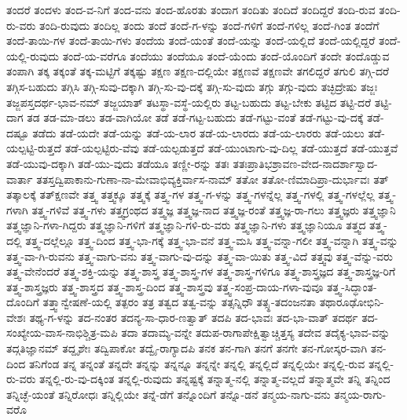 {ತಂದರೆ
ತಂದಳು
ತಂದ-ವ-ನಿಗೆ
ತಂದ-ವನು
ತಂದ-ಹೊರತು
ತಂದಾಗ
ತಂದಿತು
ತಂದಿದೆ
ತಂದಿದ್ದರೆ
ತಂದಿ-ರುವ
ತಂದಿ-ರು-ವರು
ತಂದಿ-ರುವುದು
ತಂದಿಲ್ಲ
ತಂದು
ತಂದೆ
ತಂದೆ-ಗ-ಳನ್ನು
ತಂದೆ-ಗಳಿಗೆ
ತಂದೆ-ಗಳಿಲ್ಲ
ತಂದೆ-ಗಿಂತ
ತಂದೆಗೆ
ತಂದೆ-ತಾಯಿ-ಗಳ
ತಂದೆ-ತಾಯಿ-ಗಳು
ತಂದೆಯ
ತಂದೆ-ಯಂತೆ
ತಂದೆ-ಯನ್ನು
ತಂದೆ-ಯಲ್ಲಿದೆ
ತಂದೆ-ಯಲ್ಲಿದ್ದರೆ
ತಂದೆ-ಯಲ್ಲಿ-ರುವುದು
ತಂದೆ-ಯ-ವರೆಗೂ
ತಂದೆಯು
ತಂದೆಯೂ
ತಂದೆ-ಯೆಂದು
ತಂದೆ-ಯೊಂದಿಗೆ
ತಂದೇ
ತಂದೊಡ್ಡುವ
ತಂಪಾಗಿ
ತಕ್ಕ
ತಕ್ಕಂತೆ
ತಕ್ಕ-ಮಟ್ಟಿಗೆ
ತಕ್ಕಷ್ಟು
ತಕ್ಷಣ
ತಕ್ಷಣ-ದಲ್ಲಿಯೇ
ತಕ್ಷಣವೆ
ತಕ್ಷಣವೇ
ತಗಲಿದ್ದರೆ
ತಗುಲಿ
ತಗ್ಗಿ-ದರೆ
ತಗ್ಗಿಸ-ಬಹುದು
ತಗ್ಗಿಸಿ
ತಗ್ಗಿ-ಸುವು-ದಕ್ಕಾಗಿ
ತಗ್ಗಿ-ಸು-ವು-ದಕ್ಕೆ
ತಗ್ಗಿ-ಸು-ವುದು
ತಗ್ಗು
ತಗ್ಗು-ವುದು
ತಚ್ಛಿದ್ರೇಷು
ತಜ್ಜಃ
ತಜ್ಜಪಸ್ತದರ್ಥ-ಭಾವ-ನಮ್
ತಜ್ಜಯಾತ್
ತಟಸ್ಥಾ-ವಸ್ಥೆ-ಯಲ್ಲಿರು
ತಟ್ಟ-ಬಹುದು
ತಟ್ಟ-ಬೇಕು
ತಟ್ಟಿದ
ತಟ್ಟಿ-ದರೆ
ತಟ್ಟಿ-ದಾಗ
ತಡ
ತಡ-ಮಾ-ಡಲು
ತಡ-ವಾಗಿಯೋ
ತಡೆ
ತಡೆ-ಗಟ್ಟ-ಬಹುದು
ತಡೆ-ಗಟ್ಟು-ವಂತೆ
ತಡೆ-ಗಟ್ಟು-ವು-ದಕ್ಕೆ
ತಡೆ-ದಷ್ಟೂ
ತಡೆದು
ತಡೆ-ಯದೇ
ತಡೆ-ಯನ್ನು
ತಡೆ-ಯ-ಲಾರ
ತಡೆ-ಯ-ಲಾರದು
ತಡೆ-ಯ-ಲಾರರು
ತಡೆ-ಯಲು
ತಡೆ-ಯಲ್ಪಟ್ಟಿ-ರುತ್ತದೆ
ತಡೆ-ಯಲ್ಪಟ್ಟಿರು-ವೆವು
ತಡೆ-ಯಲ್ಪಡುತ್ತದೆ
ತಡೆ-ಯುಂಟಾಗು-ವು-ದಿಲ್ಲ
ತಡೆ-ಯುತ್ತದೆ
ತಡೆ-ಯುತ್ತವೆ
ತಡೆ-ಯುವು-ದಕ್ಕಾಗಿ
ತಡೆ-ಯು-ವುದು
ತಡೆಯೂ
ತಣ್ಣೀ-ರನ್ನು
ತತಃ
ತತಃಪ್ರಾತಿಭಶ್ರಾವಣ-ವೇದ-ನಾದರ್ಶಾಸ್ವಾದ-ವಾರ್ತಾ
ತತಸ್ತದ್ವಿಪಾಕಾನು-ಗುಣಾ-ನಾ-ಮೇವಾಭಿವ್ಯಕ್ತಿರ್ವಾಸ-ನಾಮ್
ತತೋ
ತತೋ-ಣಿಮಾದಿಪ್ರಾ-ದುರ್ಭಾವಃ
ತತ್
ತತ್ಕಾಲಕ್ಕೆ
ತತ್ಕ್ಷಣವೇ
ತತ್ತ್ವ
ತತ್ತ್ವಕ್ಕೂ
ತತ್ತ್ವಕ್ಕೆ
ತತ್ತ್ವ-ಗಳ
ತತ್ತ್ವ-ಗ-ಳನ್ನು
ತತ್ತ್ವ-ಗಳನ್ನೆಲ್ಲ
ತತ್ತ್ವ-ಗಳಲ್ಲಿ
ತತ್ತ್ವ-ಗಳಲ್ಲೆಲ್ಲ
ತತ್ತ್ವ-ಗಳಾಗಿ
ತತ್ತ್ವ-ಗಳಿವೆ
ತತ್ತ್ವ-ಗಳು
ತತ್ತ್ವಗ್ರಂಥದ
ತತ್ತ್ವಜ್ಞ
ತತ್ತ್ವಜ್ಞ-ನಾದ
ತತ್ತ್ವಜ್ಞ-ರಂತೆ
ತತ್ತ್ವಜ್ಞ-ರಾ-ಗಲು
ತತ್ತ್ವಜ್ಞರು
ತತ್ತ್ವಜ್ಞಾನಿ
ತತ್ತ್ವಜ್ಞಾನಿ-ಗಳಾ-ಗಿದ್ದರು
ತತ್ತ್ವಜ್ಞಾನಿ-ಗಳಿಗೆ
ತತ್ತ್ವಜ್ಞಾನಿ-ಗಳಿ-ರು-ವರು
ತತ್ತ್ವಜ್ಞಾನಿ-ಗಳು
ತತ್ತ್ವಜ್ಞಾನಿಯೂ
ತತ್ತ್ವದ
ತತ್ತ್ವ-ದಲ್ಲಿ
ತತ್ತ್ವ-ದಲ್ಲೆಲ್ಲೂ
ತತ್ತ್ವ-ದಿಂದ
ತತ್ತ್ವ-ಭಾ-ಗಕ್ಕೆ
ತತ್ತ್ವ-ಭಾ-ವನೆ
ತತ್ತ್ವ-ಮಸಿ
ತತ್ತ್ವ-ವನ್ನಾ-ಗಲೀ
ತತ್ತ್ವ-ವನ್ನಾಗಿ
ತತ್ತ್ವ-ವನ್ನು
ತತ್ತ್ವ-ವಾ-ಗಿ-ರುವನು
ತತ್ತ್ವ-ವಾಗು-ವನು
ತತ್ತ್ವ-ವಾಗು-ವು-ದನ್ನು
ತತ್ತ್ವ-ವಾ-ಯಿತು
ತತ್ತ್ವ-ವಿದೆ
ತತ್ತ್ವವು
ತತ್ತ್ವ-ವೆನ್ನು-ವರು
ತತ್ತ್ವ-ವೇನೆಂದರೆ
ತತ್ತ್ವ-ಶಕ್ತಿ-ಯನ್ನು
ತತ್ತ್ವ-ಶಾಸ್ತ್ರ
ತತ್ತ್ವ-ಶಾಸ್ತ್ರ-ಗಳ
ತತ್ತ್ವ-ಶಾಸ್ತ್ರ-ಗಳಿಗೂ
ತತ್ತ್ವ-ಶಾಸ್ತ್ರಜ್ಞದ
ತತ್ತ್ವ-ಶಾಸ್ತ್ರಜ್ಞ-ರಿಗೆ
ತತ್ತ್ವ-ಶಾಸ್ತ್ರಜ್ಞರು
ತತ್ತ್ವ-ಶಾಸ್ತ್ರದ
ತತ್ತ್ವ-ಶಾಸ್ತ್ರ-ದಿಂದ
ತತ್ತ್ವ-ಶಾಸ್ತ್ರವು
ತತ್ತ್ವ-ಸಂಪ್ರ-ದಾಯ-ಗಳಾ-ವುವೂ
ತತ್ತ್ವ-ಸಿದ್ಧಾಂತ-ದೊಂದಿಗೆ
ತತ್ತ್ವಾನ್ವೇಷಣೆ-ಯಲ್ಲಿ
ತತ್ಪರಂ
ತತ್ರ
ತತ್ವದ
ತತ್ವ-ವನ್ನು
ತತ್ಸನ್ನಿಧೌ
ತತ್ಸ್ಥ-ತದಂಜನತಾ
ತಥಾರೂಢೋಭಿನಿ-ವೇಶಃ
ತಥ್ಯ-ಗ-ಳನ್ನು
ತದ-ನಂತರ
ತದನ್ಯ-ಸಾ-ಧಾರ-ಣತ್ವಾತ್
ತದಪಿ
ತದ-ಭಾವಃ
ತದ-ಭಾ-ವಾತ್
ತದರ್ಥ
ತದ-ಸಂಖ್ಯೇಯ-ವಾಸ-ನಾಭಿಶ್ಚಿತ್ರ-ಮಪಿ
ತದಾ
ತದಾಮ್ಯ-ವನ್ನೇ
ತದುಪ-ರಾಗಾಪೇಕ್ಷಿತ್ವಾಚ್ಚಿತ್ತಸ್ಯ
ತದೇವ
ತದೈಕ್ಯ-ಭಾವ-ವನ್ನು
ತದ್ಗತಿಜ್ಞಾನಮ್
ತದ್ದೃಶೇಃ
ತದ್ವಿಪಾಕೋ
ತದ್ವೈ-ರಾಗ್ಯಾದಪಿ
ತನಕ
ತನ-ಗಾಗಿ
ತನಗೆ
ತನಗೇ
ತನ-ಗೋಸ್ಕರ-ವಾಗಿ
ತನ-ದಿಂದ
ತನಿಗೆಂಡ
ತನ್ನ
ತನ್ನಂತೆ
ತನ್ನದೇ
ತನ್ನನ್ನು
ತನ್ನನ್ನೂ
ತನ್ನನ್ನೇ
ತನ್ನಲ್ಲಿ
ತನ್ನಲ್ಲಿದೆ
ತನ್ನಲ್ಲಿಯೇ
ತನ್ನಲ್ಲಿ-ರುವ
ತನ್ನಲ್ಲಿ-ರು-ವರು
ತನ್ನಲ್ಲಿ-ರು-ವು-ದಕ್ಕಿಂತ
ತನ್ನಲ್ಲಿ-ರುವುದು
ತನ್ನಷ್ಟಕ್ಕೆ
ತನ್ನಾತ್ಮ-ನಲ್ಲಿ
ತನ್ನಾತ್ಮ-ವಲ್ಲದೆ
ತನ್ನಾತ್ಮವೇ
ತನ್ನಿ
ತನ್ನಿಂದ
ತನ್ನಿಚ್ಛೆ-ಯಂತೆ
ತನ್ನಿರೋಧಃ
ತನ್ನಿಲ್ಲಿಯೇ
ತನ್ನೆ-ಡೆಗೆ
ತನ್ನೊಂದಿಗೆ
ತನ್ನೊ-ಡನೆ
ತನ್ಮಯ-ನಾಗು-ವನು
ತನ್ಮಯ-ರಾಗು-ವರೊ
}
